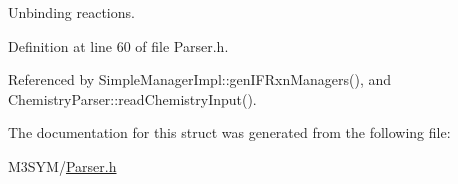 Unbinding reactions. 



Definition at line 60 of file Parser.\+h.



Referenced by Simple\+Manager\+Impl\+::gen\+I\+F\+Rxn\+Managers(), and Chemistry\+Parser\+::read\+Chemistry\+Input().



The documentation for this struct was generated from the following file\+:\begin{DoxyCompactItemize}
\item 
M3\+S\+Y\+M/\hyperlink{Parser_8h}{Parser.\+h}\end{DoxyCompactItemize}
